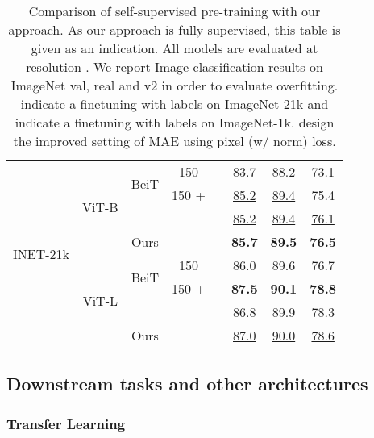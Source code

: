 \begin{table}[t]
{\begin{tabular}{c|c|ccc|ccc}
     \multirow{8}{*}{INET-21k} & \multirow{4}{*}{ViT-B}
      &  \multirow{2}{*}{BeiT}  &  150 &   & 83.7  & 88.2 & 73.1  \\
         &  &  &  150 +  &    & \underline{85.2}  &  \underline{89.4} & 75.4  \\
    \cmidrule{3-8}
& &  \cellcolor{Goldenrod}   &  \cellcolor{Goldenrod}  &   \cellcolor{Goldenrod}  &  \cellcolor{Goldenrod} \underline{85.2}  &  \cellcolor{Goldenrod} \underline{89.4} &   \cellcolor{Goldenrod} \underline{76.1}  \\
     & & \multirow{-2}{*}{\cellcolor{Goldenrod} Ours}   &  \cellcolor{Goldenrod}  &   \cellcolor{Goldenrod}  &  \cellcolor{Goldenrod} \textbf{85.7}  &  \cellcolor{Goldenrod} \textbf{89.5} &   \cellcolor{Goldenrod} \textbf{76.5}  \\
    \cmidrule{2-8}
     & \multirow{4}{*}{ViT-L}
     & \multirow{2}{*}{BeiT} &  150 &   & 86.0  & 89.6 & 76.7  \\
    &  &  &  150 +  &    & \textbf{87.5}  &  \textbf{90.1} & \textbf{78.8}  \\
    \cmidrule{3-8}
    &  &  \cellcolor{Goldenrod}   &  \cellcolor{Goldenrod}  &  \cellcolor{Goldenrod}  &   \cellcolor{Goldenrod} 86.8  &  \cellcolor{Goldenrod} 89.9 &  \cellcolor{Goldenrod} 78.3  \\
    &  & \multirow{-2}{*}{\cellcolor{Goldenrod} Ours}   &  \cellcolor{Goldenrod}  &  \cellcolor{Goldenrod}  &   \cellcolor{Goldenrod} \underline{87.0}  &  \cellcolor{Goldenrod} \underline{90.0} &  \cellcolor{Goldenrod} \underline{78.6} \\
\bottomrule
    \end{tabular}}
    \caption{Comparison of self-supervised pre-training with our approach. As our approach is fully supervised, this table is given as an indication. All models are evaluated at resolution . We report Image classification results on ImageNet val, real and v2 in order to evaluate overfitting.  indicate a finetuning with labels on ImageNet-21k and  indicate a finetuning with labels on ImageNet-1k.  design the improved setting of MAE using pixel (w/ norm) loss.
}
    \label{tab:comp_ssl}
\end{table}
 

\subsection{Downstream tasks and other architectures} 

\subsubsection{Transfer Learning}


